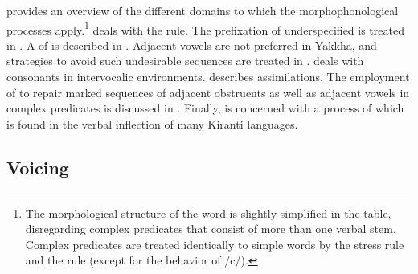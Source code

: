  provides an overview of the different domains to which the morphophonological processes apply.\footnote{The morphological structure of the word is slightly simplified in the table, disregarding complex predicates that consist of more than one verbal stem. Complex predicates are treated identically to simple words by the stress rule and the  rule (except for the behavior of /c/).}  deals with  the  rule. The prefixation of underspecified  is treated in . A  of  is described in . Adjacent vowels are not preferred in Yakkha, and strategies to avoid such undesirable sequences are treated in .  deals with consonants in intervocalic environments.  describes assimilations. The employment of  to repair marked sequences of adjacent obstruents as well as adjacent vowels in complex predicates is discussed in . Finally,  is concerned with a process of  which is found in the verbal inflection of many Kiranti languages.








\subsection{Voicing}\label{voicing}

